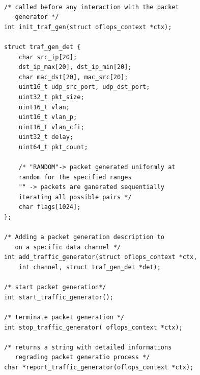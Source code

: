 \documentclass{book}
\begin{document}
\begin{lstlisting}[caption={Traffic generation methods}]

/* called before any interaction with the packet
   generator */
int init_traf_gen(struct oflops_context *ctx);

struct traf_gen_det {
    char src_ip[20];
    dst_ip_max[20], dst_ip_min[20];
    char mac_dst[20], mac_src[20];
    uint16_t udp_src_port, udp_dst_port;
    uint32_t pkt_size;
    uint16_t vlan;
    uint16_t vlan_p;
    uint16_t vlan_cfi;
    uint32_t delay;
    uint64_t pkt_count;

    /* "RANDOM"-> packet generated uniformly at 
    random for the specified ranges 
    "" -> packets are ganerated sequentially 
    iterating all possible pairs */
    char flags[1024];
};

/* Adding a packet generation description to 
   on a specific data channel */
int add_traffic_generator(struct oflops_context *ctx, 
    int channel, struct traf_gen_det *det);

/* start packet generation*/
int start_traffic_generator();

/* terminate packet generation */
int stop_traffic_generator( oflops_context *ctx);

/* returns a string with detailed informations 
   regrading packet generatio process */
char *report_traffic_generator(oflops_context *ctx);
\end{lstlisting}
\end{document}
